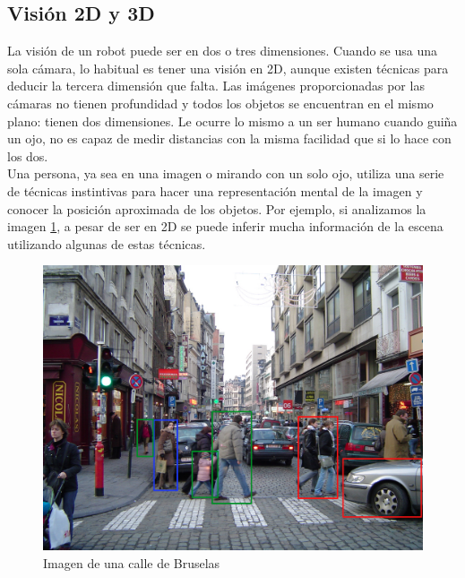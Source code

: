\subsection{Visión 2D y 3D}
\label{subsec:vision2dy3d}

La visión de un robot puede ser en dos o tres dimensiones. Cuando se usa una sola cámara, lo habitual es tener una visión en 2D, aunque existen técnicas para deducir la tercera dimensión que falta. Las imágenes proporcionadas por las cámaras no tienen profundidad y todos los objetos se encuentran en el mismo plano: tienen dos dimensiones. Le ocurre lo mismo a un ser humano cuando guiña un ojo, no es capaz de medir distancias con la misma facilidad que si lo hace con los dos. \\

Una persona, ya sea en una imagen o mirando con un solo ojo, utiliza una serie de técnicas instintivas para hacer una representación mental de la imagen y conocer la posición aproximada de los objetos. Por ejemplo, si analizamos la imagen \ref{fig:calle-de-bruselas}, a pesar de ser en 2D se puede inferir mucha información de la escena utilizando algunas de estas técnicas. 

\begin{figure} [h]
  \begin{center}
    \includegraphics[width=12cm]{img/cap1/calle-de-bruselas}
  \end{center}
  \caption{Imagen de una calle de Bruselas}
  \label{fig:calle-de-bruselas}
\end{figure}

